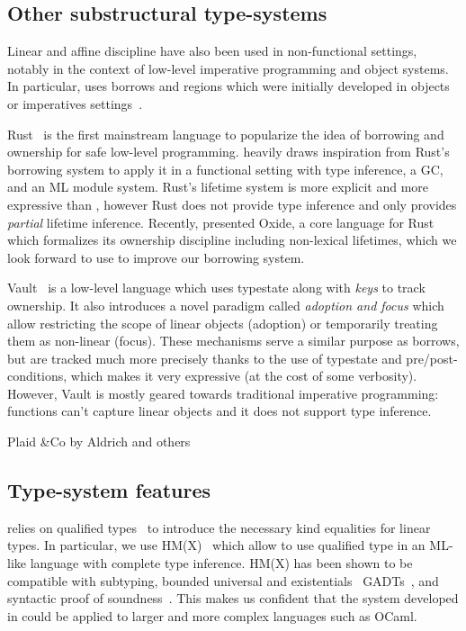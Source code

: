 \subsection{Other substructural type-systems}

Linear and affine discipline have also been used in non-functional
settings, notably in the context of low-level imperative programming
and object systems. In particular, \lang uses borrows and regions
which were initially developed in objects or
imperatives settings~\citep{DBLP:conf/popl/BoylandR05,DBLP:conf/pldi/GrossmanMJHWC02}.

Rust~\citep{rust} is the first
mainstream language to popularize the idea of borrowing and ownership
for safe low-level programming.
\lang heavily draws inspiration from Rust's borrowing system to apply
it in a functional setting with type inference, a GC, and
an ML module system.
Rust's lifetime system is more explicit and more expressive than \lang,
however Rust does not provide type inference
and only provides \emph{partial} lifetime inference.
Recently, \citet{DBLP:journals/corr/abs-1903-00982} presented Oxide,
a core language for Rust which formalizes its ownership discipline
including non-lexical lifetimes, which we look forward to use to improve
our borrowing system.

Vault~\citep{DBLP:conf/pldi/DeLineF01}
is a low-level language which uses typestate along with \emph{keys}
to track ownership. It also introduces a novel paradigm
called \emph{adoption and focus} \citep{DBLP:conf/pldi/FahndrichD02}
which allow restricting the scope of linear objects
(adoption) or temporarily treating them as non-linear (focus).
These mechanisms serve a similar purpose as borrows, but are tracked
much more precisely thanks to the use of typestate and pre/post-conditions,
which makes it very expressive (at the cost of some verbosity).
However, Vault is mostly geared towards traditional imperative programming:
functions can't capture linear objects and it does not support
type inference.

Plaid \&Co by Aldrich and others

\subsection{Type-system features}

\lang relies on qualified types~\cite{DBLP:journals/scp/Jones94}
to introduce the necessary kind equalities for linear types. In
particular, we use HM(X)~\citep{DBLP:journals/tapos/OderskySW99} which
allow to use qualified type in an ML-like language with complete
type inference.
HM(X) has been shown to be compatible with subtyping,
bounded universal and existentials~\citep{DBLP:conf/icfp/Simonet03}
GADTs~\citep{DBLP:journals/toplas/SimonetP07},
and syntactic proof of soundness~\citep{DBLP:journals/entcs/SkalkaP02}.
This makes us confident that the system developed in \lang
could be applied to larger and more complex languages such as OCaml.

